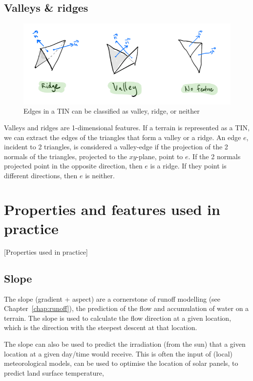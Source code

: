 \subsection{Valleys \& ridges}

\begin{figure}
  \centering
  \includegraphics[width=\linewidth]{figs/valley_ridge}
  \caption{Edges in a TIN can be classified as valley, ridge, or neither}%
\label{fig:valley_ridge}
\end{figure}
Valleys and ridges are 1-dimensional features.
If a terrain is represented as a TIN, we can extract the edges of the triangles that form a valley or a ridge.
An edge $e$, incident to 2 triangles, is considered a valley-edge if the projection of the 2 normals of the triangles, projected to the $xy$-plane, point to $e$.
If the 2 normals projected point in the opposite direction, then $e$ is a ridge.
If they point is different directions, then $e$ is neither.



%
\section{Properties and features used in practice}[Properties used in practice]


\subsection{Slope}%

The slope (gradient + aspect) are a cornerstone of runoff modelling (see Chapter~\ref{chap:runoff}), the prediction of the flow and accumulation of water on a terrain.
The slope is used to calculate the flow direction at a given location, which is the direction with the steepest descent at that location.

%

The slope can also be used to predict the irradiation (from the sun) that a given location at a given day/time would receive.
This is often the input of (local) meteorological models, can be used to optimise the location of solar panels, to predict land surface temperature, 


